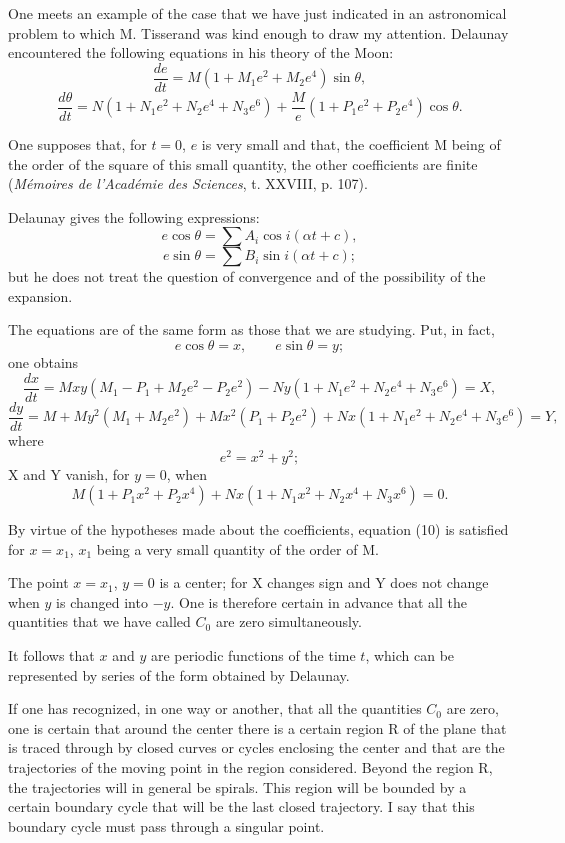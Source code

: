 \documentclass[11pt]{article}
\begin{document}
One meets an example of the case that we have just indicated in an astronomical problem to which M. Tisserand was kind enough to draw my attention. Delaunay encountered the following equations in his theory of the Moon:
\[
\frac{de}{dt}=M(1+M_1e^2+M_2e^4)\sin\theta,
\]
\[
\frac{d\theta}{dt}=N(1+N_1e^2+N_2e^4+N_3e^6)+\frac{M}{e}(1+P_1e^2+P_2e^4)\cos\theta.
\]

One supposes that, for $t=0$, $e$ is very small and that, the coefficient M being of the order of the square of this small quantity, the other coefficients are finite (\emph{Mémoires de l’Académie des Sciences}, t. XXVIII, p. 107).

Delaunay gives the following expressions:
\[
e\cos\theta=\sum A_i\cos i(\alpha t+c),
\]
\[
e\sin\theta=\sum B_i\sin i(\alpha t+c);
\]
but he does not treat the question of convergence and of the possibility of the expansion.

The equations are of the same form as those that we are studying. Put, in fact,
\[
e\cos\theta=x,
\qquad
e\sin\theta=y;
\]
one obtains
\[
\frac{dx}{dt}=Mxy(M_1-P_1+M_2e^2-P_2e^2)-Ny(1+N_1e^2+N_2e^4+N_3e^6)=X,
\]
\[
\frac{dy}{dt}=M+My^2(M_1+M_2e^2)+Mx^2(P_1+P_2e^2)+Nx(1+N_1e^2+N_2e^4+N_3e^6)=Y,
\]
where
\[
e^2=x^2+y^2;
\]
X and Y vanish, for $y=0$, when
\begin{equation}\tag{10}
M(1+P_1x^2+P_2x^4)+Nx(1+N_1x^2+N_2x^4+N_3x^6)=0.
\end{equation}

By virtue of the hypotheses made about the coefficients, equation (10) is satisfied for $x=x_1$, $x_1$ being a very small quantity of the order of M.

The point $x=x_1$, $y=0$ is a center; for X changes sign and Y does not change when $y$ is changed into $-y$. One is therefore certain in advance that all the quantities that we have called $C_0$ are zero simultaneously.

It follows that $x$ and $y$ are periodic functions of the time $t$, which can be represented by series of the form obtained by Delaunay.

If one has recognized, in one way or another, that all the quantities $C_0$ are zero, one is certain that around the center there is a certain region R of the plane that is traced through by closed curves or cycles enclosing the center and that are the trajectories of the moving point in the region considered. Beyond the region R, the trajectories will in general be spirals. This region will be bounded by a certain boundary cycle that will be the last closed trajectory. I say that this boundary cycle must pass through a singular point.
\end{document}
